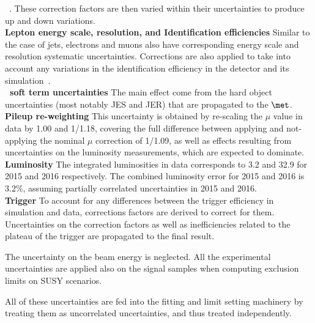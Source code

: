 ~\cite{ATL-PHYS-PUB-2015-022,ATL-PHYS-PUB-2016-012}.
These correction factors are then varied within
their uncertainties to produce up and down variations.\\
\textbf{Lepton energy scale, resolution, and Identification efficiencies}
Similar to the case of jets, electrons and muons also have corresponding 
energy scale and resolution systematic uncertainties. Corrections are 
also applied to take into account any variations in the identification 
efficiency in the detector and its simulation~\cite{ATLAS-CONF-2016-024,Aad:2016jkr,ATLAS-CONF-2016-024}.\\
\textbf{\met\ soft term uncertainties}
The main effect come from the hard object uncertainties (most notably JES and 
JER) that are propagated to the $\met$.\\
\textbf{Pileup re-weighting}
This uncertainty is obtained by re-scaling the $\mu$ value in data by 1.00 and 1/1.18, 
covering the full difference between applying and not-applying the nominal $\mu$ correction of 1/1.09, 
as well as effects resulting from uncertainties on the luminosity measurements, which are expected to dominate.\\
\textbf{Luminosity}
The integrated luminosities in data corresponds to 3.2 \ifb and 32.9 \ifb 
for 2015 and 2016 respectively. The combined luminosity error for 2015 and 2016 is 3.2\%, assuming partially correlated uncertainties in 2015 and 2016.\\
\textbf{Trigger}
To account for any differences between the trigger efficiency in simulation 
and data, corrections factors are derived to correct for them. 
Uncertainties on the correction factors as well as inefficiencies 
related to the plateau of the trigger are propagated to the final result.

The uncertainty on the beam energy is neglected. 
All the experimental uncertainties are applied also on the signal samples when computing exclusion limits on SUSY scenarios. 


All of these uncertainties are fed into the fitting and limit setting 
machinery by treating them as uncorrelated uncertainties, and thus 
treated independently. 
